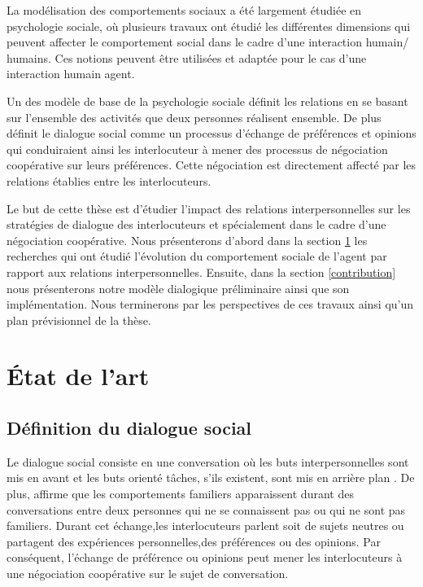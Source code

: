 \documentclass[a4paper,french]{article}
\begin{document}
\par La modélisation des comportements sociaux a été largement étudiée en psychologie sociale, où plusieurs travaux ont étudié les différentes dimensions qui peuvent affecter le comportement social dans le cadre d’une interaction humain/ humains. Ces notions peuvent être utilisées et adaptée pour le cas d’une interaction humain agent.
\par Un des modèle de base de la psychologie sociale définit les relations en se basant sur l'ensemble des activités que deux personnes réalisent ensemble. De plus%
\cite{laver1981linguistic} définit le dialogue social comme un processus d'échange de préférences et opinions qui conduiraient ainsi les interlocuteur à mener des processus de négociation coopérative sur leurs préférences. Cette négociation est directement affecté par les relations établies entre les interlocuteurs.


\par Le but de cette thèse est d'étudier l'impact des relations interpersonnelles sur les stratégies de dialogue des interlocuteurs et spécialement dans le cadre d'une négociation coopérative. Nous présenterons d'abord dans la section \ref{RW} les recherches qui ont étudié l'évolution du comportement sociale de l'agent par rapport aux relations interpersonnelles. Ensuite, dans la section \ref{contribution} nous présenterons notre modèle dialogique préliminaire ainsi que son implémentation. Nous terminerons par les perspectives de ces travaux ainsi qu'un plan prévisionnel de la thèse.

\section{État de l'art}
\label{RW}

\subsection{Définition du dialogue social}
\par Le dialogue social consiste en une conversation où les buts interpersonnelles sont mis en avant et les buts orienté tâches, s'ils existent, sont mis en arrière plan \cite{bickmore2005social}. De plus, \cite{laver1981linguistic} affirme que les comportements familiers apparaissent durant des conversations entre deux personnes qui ne se connaissent pas ou qui ne sont pas familiers. Durant cet échange,les interlocuteurs parlent soit de sujets neutres ou partagent des expériences personnelles,des préférences ou des opinions. Par conséquent, l'échange de préférence ou opinions peut mener les interlocuteurs à une négociation coopérative sur le sujet de conversation.
\end{document}

